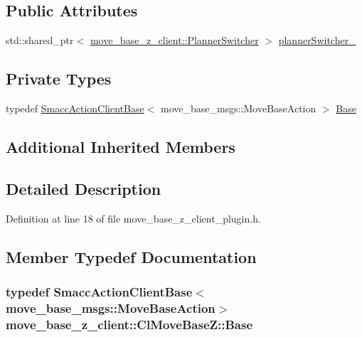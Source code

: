 \subsection*{Public Attributes}
\begin{DoxyCompactItemize}
\item 
std\+::shared\+\_\+ptr$<$ \hyperlink{classmove__base__z__client_1_1PlannerSwitcher}{move\+\_\+base\+\_\+z\+\_\+client\+::\+Planner\+Switcher} $>$ \hyperlink{classmove__base__z__client_1_1ClMoveBaseZ_ac57d2293bc0a5c4fcef326379822cc5e}{planner\+Switcher\+\_\+}
\end{DoxyCompactItemize}
\subsection*{Private Types}
\begin{DoxyCompactItemize}
\item 
typedef \hyperlink{classsmacc_1_1SmaccActionClientBase_a55625fdfd8344a88919aa6fa935b66fe}{Smacc\+Action\+Client\+Base}$<$ move\+\_\+base\+\_\+msgs\+::\+Move\+Base\+Action $>$ \hyperlink{classmove__base__z__client_1_1ClMoveBaseZ_a5446f4fb56caf7c8de8dd3bd34ae64d6}{Base}
\end{DoxyCompactItemize}
\subsection*{Additional Inherited Members}


\subsection{Detailed Description}


Definition at line 18 of file move\+\_\+base\+\_\+z\+\_\+client\+\_\+plugin.\+h.



\subsection{Member Typedef Documentation}
\subsubsection[{\texorpdfstring{Base}{Base}}]{\setlength{\rightskip}{0pt plus 5cm}typedef {\bf Smacc\+Action\+Client\+Base}$<$move\+\_\+base\+\_\+msgs\+::\+Move\+Base\+Action$>$ {\bf move\+\_\+base\+\_\+z\+\_\+client\+::\+Cl\+Move\+Base\+Z\+::\+Base}\hspace{0.3cm}{\ttfamily [private]}}\hypertarget{classmove__base__z__client_1_1ClMoveBaseZ_a5446f4fb56caf7c8de8dd3bd34ae64d6}{}\label{classmove__base__z__client_1_1ClMoveBaseZ_a5446f4fb56caf7c8de8dd3bd34ae64d6}


